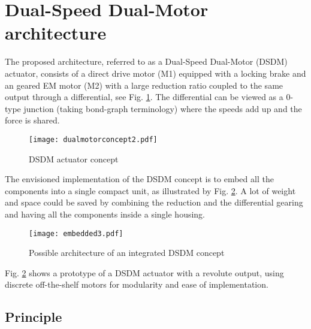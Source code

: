 \section{Dual-Speed Dual-Motor architecture}
\label{sec:DSDM}

The proposed architecture, referred to as a Dual-Speed Dual-Motor (DSDM) actuator, consists of a direct drive motor (M1) equipped with a locking brake and an geared EM motor (M2) with a large reduction ratio coupled to the same output through a differential, see Fig. \ref{fig:dualmotorconcept}. The differential can be viewed as a 0-type junction (taking bond-graph terminology) where the speeds add up and the force is shared. 


\begin{figure}[H]
	\centering
		\texttt{[image: dualmotorconcept2.pdf]}
	\caption{DSDM actuator concept}
	\label{fig:dualmotorconcept}
\end{figure}

The envisioned implementation of the DSDM concept is to embed all the components into a single compact unit, as illustrated by Fig. \ref{fig:embedded}. A lot of weight and space could be saved by combining the reduction and the differential gearing and having all the components inside a single housing. 


\begin{figure}[H]
	\centering
		\texttt{[image: embedded3.pdf]}
	\caption{Possible architecture of an integrated DSDM concept}
	\label{fig:embedded}
\end{figure}

Fig. \ref{fig:embedded} shows a prototype of a DSDM actuator with a revolute output, using discrete off-the-shelf motors for modularity and ease of implementation.


\subsection{Principle}
\label{sec:princ}



